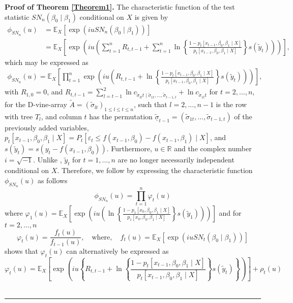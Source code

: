 \documentclass[harvard,11pt]{article}
\newcommand{\E}{\mathbb{E}}
\newenvironment{proof}[1][Proof]{\textbf{#1.} }{\  \rule{0.5em}{0.5em}}
\begin{document}
\begin{proof}[Proof of Theorem \protect\ref{Theorem1}]
 The characteristic function of the test statistic $SN_n(\beta_0\mid\beta_1)$ conditional on $X$ is given by
\begingroup
\allowdisplaybreaks
\begin{align*}
\phi_{SN_n}(u)&=\mathbb{E}_{X}\left[\exp(iu SN_n(\beta_0\mid\beta_1))\right]\\
&=\E_X\left[\exp\left(iu\left(\sum\limits_{t=1}^n R_{t,t-1}+\sum\limits_{t=1}^{n}\ln\left\{\frac{1-p_t[x_{t-1},\beta_0,\beta_1\mid X]}{p_t[x_{t-1},\beta_0,\beta_1\mid X]}\right\}s(\tilde{y}_t)\right)\right)\right],
\end{align*}
\endgroup
which may be expressed as
\begingroup
\allowdisplaybreaks
\begin{align*}
\phi_{SN_n}(u)=\E_X\left[\prod\limits_{t=1}^{n}\exp\left(iu\left(R_{t,t-1}+\ln\left\{\frac{1-p_t[x_{t-1},\beta_0,\beta_1\mid X]}{p_t[x_{t-1},\beta_0,\beta_1\mid X]}\right\}s(\tilde{y}_t)\right)\right)\right],
\end{align*}
\endgroup
with $R_{1,0}=0$, and $R_{t,t-1}=\sum\limits_{l=t-1}^{2}\ln c_{\tilde{\sigma}_{lt}t\mid \tilde{\sigma}_{1t},...,\tilde{\sigma}_{t-1,t}}+\ln c_{\tilde{\sigma}_{1t}t}$ for $t=2,...,n$, for the D-vine-array $\tilde{A}=(\tilde{\sigma}_{lt})_{1\leq l\leq t\leq n}$, such that $l=2,...,n-1$ is the row with tree $T_l$, and column $t$ has the permutation $\tilde{\underline{\sigma}}_{t-1}=(\tilde{\sigma}_{1t},...,\tilde{\sigma}_{t-1,t})$ of the previously added variables, $p_t[x_{t-1},\beta_0,\beta_1\mid X]=P_t[\varepsilon_t\leq f(x_{t-1},\beta_0)-f(x_{t-1},\beta_1)\mid X]$, and $s(\tilde{y}_t)=s(y_t-f(x_{t-1},\beta_0))$. Furthermore, $u\in\mathbb{R}$ and the complex number $i=\sqrt{-1}$. Unlike \citet{dufour2010exact}, $\tilde{y}_t$ for $t=1,...,n$ are no longer necessarily independent conditional on $X$. Therefore, we follow \citet{heinrich1982factorization} by expressing the characteristic function $\phi_{SN_n}(u)$ as follows
\[
\phi_{SN_n}(u)=\prod\limits_{t=1}^{n}\varphi_t(u)
\]
where $\varphi_1(u)=\E_X\left[\exp(iu\left(\ln\left\{\frac{1-p_1[x_{0},\beta_0,\beta_1\mid X]}{p_1[x_{0},\beta_0,\beta_1\mid X]}\right\}s(\tilde{y}_1)\right))\right]$ and for $t=2,...,n$
\[
\varphi_t(u)=\frac{f_t(u)}{f_{t-1}(u)},\quad\text{where},\quad f_t(u)=\E_X\left[\exp(iuSN_t(\beta_0\mid\beta_1))\right]
\] 
\citet{heinrich1982factorization} shows that $\varphi_t(u)$ can alternatively be expressed as
\[
\varphi_t(u)=\E_X\left[\exp\left(iu\left\{R_{t,t-1}+\ln\left\{\frac{1-p_t[x_{t-1},\beta_0,\beta_1\mid X]}{p_t[x_{t-1},\beta_0,\beta_1\mid X]}\right\}s(\tilde{y}_t)\right\}\right)\right]+\rho_t(u)
\]
\end{proof}
\end{document}
